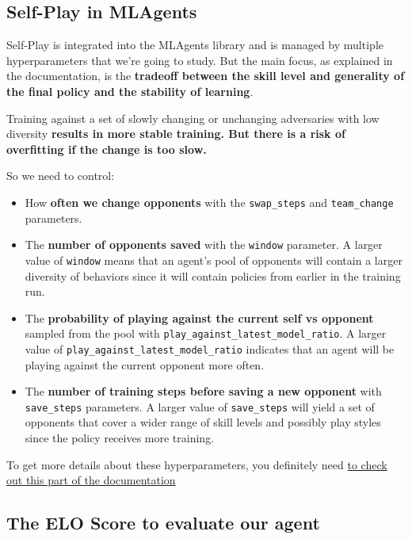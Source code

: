 \documentclass[11pt,a4paper]{article}
\begin{document}
\subsection{Self-Play in MLAgents}\label{self-play-in-mlagents}

Self-Play is integrated into the MLAgents library and is managed by multiple hyperparameters that we're going to study. But the main focus, as explained in the documentation, is the \textbf{tradeoff between the skill level and generality of the final policy and the stability of learning}.

Training against a set of slowly changing or unchanging adversaries with low diversity \textbf{results in more stable training. But there is a risk of overfitting if the change is too slow.}

So we need to control:

\begin{itemize}
\item
  How \textbf{often we change opponents} with the \texttt{swap\_steps} and \texttt{team\_change} parameters.
\item
  The \textbf{number of opponents saved} with the \texttt{window} parameter. A larger value of \texttt{window} means that an agent's pool of opponents will contain a larger diversity of behaviors since it will contain policies from earlier in the training run.
\item
  The \textbf{probability of playing against the current self vs opponent} sampled from the pool with \texttt{play\_against\_latest\_model\_ratio}. A larger value of \texttt{play\_against\_latest\_model\_ratio} indicates that an agent will be playing against the current opponent more often.
\item
  The \textbf{number of training steps before saving a new opponent} with \texttt{save\_steps} parameters. A larger value of \texttt{save\_steps} will yield a set of opponents that cover a wider range of skill levels and possibly play styles since the policy receives more training.
\end{itemize}

To get more details about these hyperparameters, you definitely need \href{https://github.com/Unity-Technologies/ml-agents/blob/develop/docs/Training-Configuration-File.md\#self-play}{to check out this part of the documentation}

\subsection{The ELO Score to evaluate our agent}\label{the-elo-score-to-evaluate-our-agent}
\end{document}
